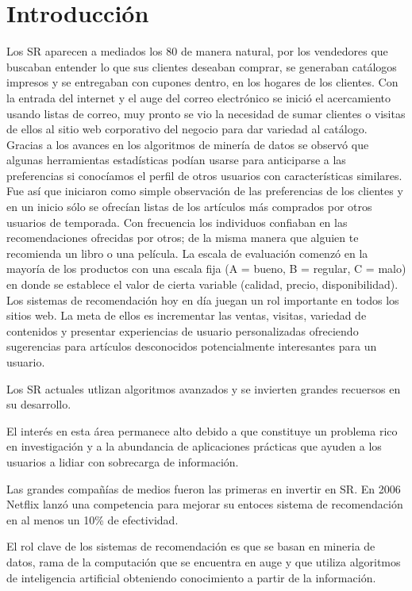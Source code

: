 \section{Introducción}
Los SR aparecen a mediados los 80 de manera natural, por los vendedores que buscaban entender lo que sus clientes deseaban comprar, se generaban catálogos impresos y se entregaban con cupones dentro, en los hogares de los clientes. Con la entrada del internet y el auge del correo electrónico se inició el acercamiento usando listas de correo, muy pronto se vio la necesidad de sumar clientes o visitas de ellos al sitio web corporativo del negocio para dar variedad al catálogo. Gracias a los avances en los algoritmos de minería de datos se observó que algunas herramientas estadísticas podían usarse para anticiparse a las preferencias si conocíamos el perfil de otros usuarios con características similares. Fue así que iniciaron como simple observación de las preferencias de los
clientes y en un inicio sólo  se ofrecían listas de los artículos más comprados por otros usuarios de temporada. Con frecuencia los individuos confiaban en las
recomendaciones ofrecidas por otros; de la misma manera que alguien
te recomienda un libro o una película. La escala de evaluación comenzó
en la mayoría de los productos con una escala fija (A = bueno, B =
regular, C = malo) en donde se establece el valor de cierta variable
(calidad, precio, disponibilidad).
Los sistemas de recomendación hoy en día juegan un rol importante en todos los sitios web. La meta de ellos
es incrementar las ventas, visitas, variedad de contenidos y presentar experiencias de usuario
personalizadas ofreciendo sugerencias para artículos desconocidos
potencialmente interesantes para un usuario.

Los SR actuales utlizan algoritmos avanzados y se invierten grandes recuersos en su desarrollo.

El interés en esta área permanece alto debido a que constituye un
problema rico en investigación y a la abundancia de aplicaciones
prácticas que ayuden a los usuarios a lidiar con sobrecarga de
información.

Las grandes compañías de medios fueron las primeras en invertir en
SR. En 2006 Netflix lanzó una competencia para mejorar su entoces sistema de recomendación en al menos un 10\% de efectividad.

El rol clave de los sistemas de recomendación es que se basan en mineria de datos, rama de la computación que se encuentra en auge y que utiliza algoritmos de inteligencia artificial obteniendo conocimiento a partir de la información.


